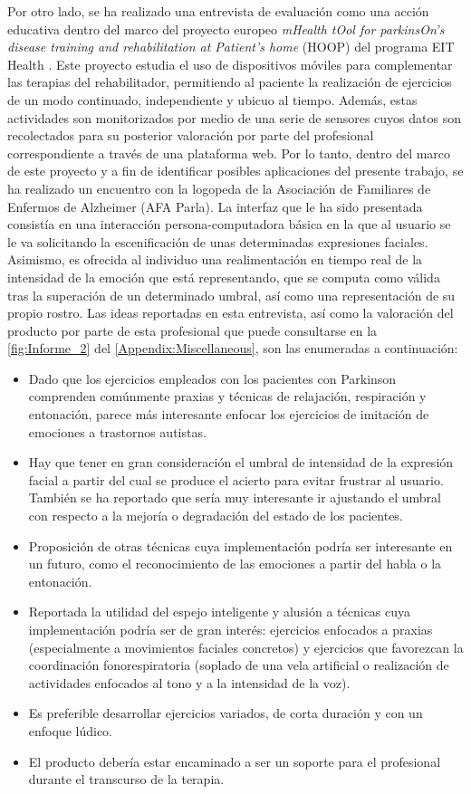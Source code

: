 Por otro lado, se ha realizado una entrevista de evaluación como una acción educativa dentro del marco del proyecto europeo \textit{mHealth tOol for parkinsOn’s disease training and rehabilitation at Patient’s home} (HOOP) del programa EIT Health \cite{EITHealth}. Este proyecto estudia el uso de dispositivos móviles para complementar las terapias del rehabilitador, permitiendo al paciente la realización de ejercicios de un modo continuado, independiente y ubicuo al tiempo. Además, estas actividades son monitorizados por medio de una serie de sensores cuyos datos son recolectados para su posterior valoración por parte del profesional correspondiente a través de una plataforma web. Por lo tanto, dentro del marco de este proyecto y a fin de identificar posibles aplicaciones del presente trabajo, se ha realizado un encuentro con la logopeda de la Asociación de Familiares de Enfermos de Alzheimer (AFA Parla). La interfaz que le ha sido presentada consistía en una interacción persona-computadora básica en la que al usuario se le va solicitando la escenificación de unas determinadas expresiones faciales. Asimismo, es ofrecida al individuo una realimentación en tiempo real de la intensidad de la emoción que está representando, que se computa como válida tras la superación de un determinado umbral, así como una representación de su propio rostro. Las ideas reportadas en esta entrevista, así como la valoración del producto por parte de esta profesional que puede consultarse en la \autoref{fig:Informe_2} del \autoref{Appendix:Miscellaneous}, son las enumeradas a continuación:
\begin{itemize}
    \item Dado que los ejercicios empleados con los pacientes con Parkinson comprenden comúnmente praxias y técnicas de relajación, respiración y entonación, parece más interesante enfocar los ejercicios de imitación de emociones a trastornos autistas.
    \item Hay que tener en gran consideración el umbral de intensidad de la expresión facial a partir del cual se produce el acierto para evitar frustrar al usuario. También se ha reportado que sería muy interesante ir ajustando el umbral con respecto a la mejoría o degradación del estado de los pacientes.
    \item Proposición de otras técnicas cuya implementación podría ser interesante en un futuro, como el reconocimiento de las emociones a partir del habla o la entonación.
    \item Reportada la utilidad del espejo inteligente y alusión a técnicas cuya implementación podría ser de gran interés: ejercicios enfocados a praxias (especialmente a movimientos faciales concretos) y ejercicios que favorezcan la coordinación fonorespiratoria (soplado de una vela artificial o realización de actividades enfocados al tono y a la intensidad de la voz).
    \item Es preferible desarrollar ejercicios variados, de corta duración y con un enfoque lúdico.
    \item El producto debería estar encaminado a ser un soporte para el profesional durante el transcurso de la terapia.
\end{itemize}




